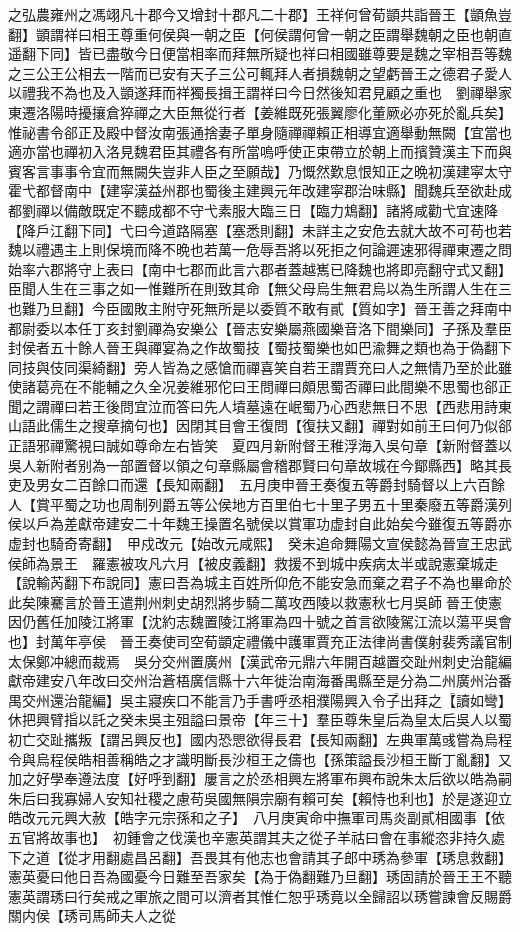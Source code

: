 之弘農雍州之馮翊凡十郡今又增封十郡凡二十郡】王祥何曾荀顗共詣晉王【顗魚豈翻】顗謂祥曰相王尊重何侯與一朝之臣【何侯謂何曾一朝之臣謂舉魏朝之臣也朝直遥翻下同】皆已盡敬今日便當相率而拜無所疑也祥曰相國雖尊要是魏之宰相吾等魏之三公王公相去一階而已安有天子三公可輒拜人者損魏朝之望虧晉王之德君子愛人以禮我不為也及入顗遂拜而祥獨長揖王謂祥曰今日然後知君見顧之重也　劉禪舉家東遷洛陽時擾攘倉猝禪之大臣無從行者【姜維既死張翼廖化董厥必亦死於亂兵矣】惟祕書令郤正及殿中督汝南張通捨妻子單身隨禪禪賴正相導宜適舉動無闕【宜當也適亦當也禪初入洛見魏君臣其禮各有所當嗚呼使正束帶立於朝上而擯贊漢主下而與賓客言事事令宜而無闕失豈非人臣之至願哉】乃慨然歎息恨知正之晩初漢建寜太守霍弋都督南中【建寜漢益州郡也蜀後主建興元年改建寜郡治味縣】聞魏兵至欲赴成都劉禪以備敵既定不聽成都不守弋素服大臨三日【臨力鴆翻】諸將咸勸弋宜速降【降戶江翻下同】弋曰今道路隔塞【塞悉則翻】未詳主之安危去就大故不可苟也若魏以禮遇主上則保境而降不晩也若萬一危辱吾將以死拒之何論遲速邪得禪東遷之問始率六郡將守上表曰【南中七郡而此言六郡者蓋越嶲已降魏也將即亮翻守式又翻】臣聞人生在三事之如一惟難所在則致其命【無父母烏生無君烏以為生所謂人生在三也難乃旦翻】今臣國敗主附守死無所是以委質不敢有貳【質如字】晉王善之拜南中都尉委以本任丁亥封劉禪為安樂公【晉志安樂屬燕國樂音洛下間樂同】子孫及羣臣封侯者五十餘人晉王與禪宴為之作故蜀技【蜀技蜀樂也如巴渝舞之類也為于偽翻下同技與伎同渠綺翻】旁人皆為之感愴而禪喜笑自若王謂賈充曰人之無情乃至於此雖使諸葛亮在不能輔之久全况姜維邪佗曰王問禪曰頗思蜀否禪曰此間樂不思蜀也郤正聞之謂禪曰若王後問宜泣而答曰先人墳墓遠在岷蜀乃心西悲無日不思【西悲用詩東山語此儒生之搜章摘句也】因閉其目會王復問【復扶又翻】禪對如前王曰何乃似郤正語邪禪驚視曰誠如尊命左右皆笑　夏四月新附督王稚浮海入吳句章【新附督蓋以吳人新附者别為一部置督以領之句章縣屬會稽郡賢曰句章故城在今鄮縣西】略其長吏及男女二百餘口而還【長知兩翻】　五月庚申晉王奏復五等爵封騎督以上六百餘人【賞平蜀之功也周制列爵五等公侯地方百里伯七十里子男五十里秦廢五等爵漢列侯以戶為差獻帝建安二十年魏王操置名號侯以賞軍功虚封自此始矣今雖復五等爵亦虚封也騎奇寄翻】　甲戍改元【始改元咸熙】　癸未追命舞陽文宣侯懿為晉宣王忠武侯師為景王　羅憲被攻凡六月【被皮義翻】救援不到城中疾病太半或說憲棄城走【說輸芮翻下布說同】憲曰吾為城主百姓所仰危不能安急而棄之君子不為也畢命於此矣陳騫言於晉王遣荆州刺史胡烈將步騎二萬攻西陵以救憲秋七月吳師晉王使憲因仍舊任加陵江將軍【沈約志魏置陵江將軍為四十號之首言欲陵駕江流以蕩平吳會也】封萬年亭侯　晉王奏使司空荀顗定禮儀中護軍賈充正法律尚書僕射裴秀議官制太保鄭冲總而裁焉　吳分交州置廣州【漢武帝元鼎六年開百越置交趾州刺史治龍編獻帝建安八年改曰交州治蒼梧廣信縣十六年徙治南海番禺縣至是分為二州廣州治番禺交州還治龍編】吳主寢疾口不能言乃手書呼丞相濮陽興入令子出拜之【讀如彎】休把興臂指以託之癸未吳主殂謚曰景帝【年三十】羣臣尊朱皇后為皇太后吳人以蜀初亡交趾攜叛【謂呂興反也】國内恐愳欲得長君【長知兩翻】左典軍萬彧嘗為烏程令與烏程侯皓相善稱皓之才識明斷長沙桓王之儔也【孫策謚長沙桓王斷丁亂翻】又加之好學奉遵法度【好呼到翻】屢言之於丞相興左將軍布興布說朱太后欲以皓為嗣朱后曰我寡婦人安知社稷之慮苟吳國無隕宗廟有賴可矣【賴恃也利也】於是遂迎立皓改元元興大赦【皓字元宗孫和之子】　八月庚寅命中撫軍司馬炎副貳相國事【依五官將故事也】　初鍾會之伐漢也辛憲英謂其夫之從子羊祜曰會在事縱恣非持久處下之道【從才用翻處昌呂翻】吾畏其有他志也會請其子郎中琇為參軍【琇息救翻】憲英憂曰他日吾為國憂今日難至吾家矣【為于偽翻難乃旦翻】琇固請於晉王王不聽憲英謂琇曰行矣戒之軍旅之間可以濟者其惟仁恕乎琇竟以全歸詔以琇嘗諫會反賜爵關内侯【琇司馬師夫人之從